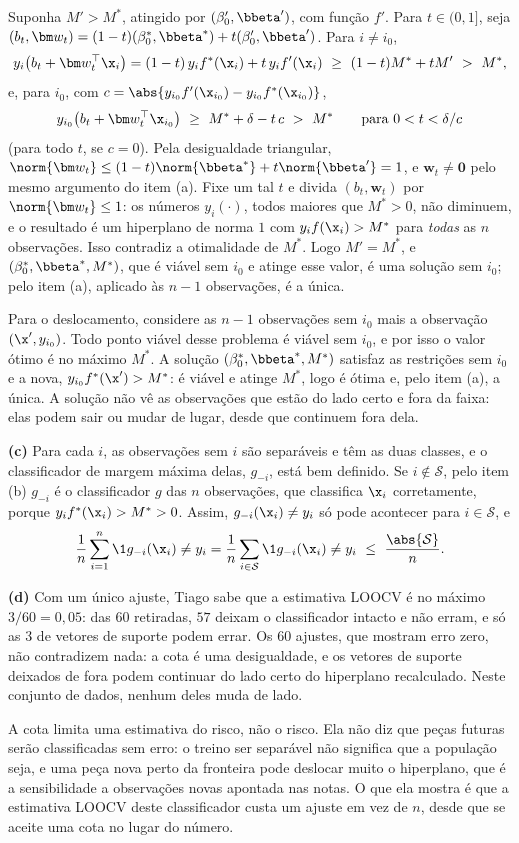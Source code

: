 \begin{solucao}
Suponha $M'>M^*$, atingido por $(\beta_0',\bbeta')$, com função $f'$. Para $t\in(0,1]$, seja
$(b_t,\bm w_t)=(1-t)(\beta_0^*,\bbeta^*)+t(\beta_0',\bbeta')$. Para $i\ne i_0$,
\[
  y_i\big(b_t+\bm w_t^\top\x_i\big)=(1-t)\,y_if^*(\x_i)+t\,y_if'(\x_i)\ \ge\ (1-t)M^*+tM'\ >\ M^* ,
\]
e, para $i_0$, com $c=\abs{y_{i_0}f'(\x_{i_0})-y_{i_0}f^*(\x_{i_0})}$,
\[
  y_{i_0}\big(b_t+\bm w_t^\top\x_{i_0}\big)\ \ge\ M^*+\delta-t\,c\ >\ M^*
  \qquad\text{para }0<t<\delta/c
\]
(para todo $t$, se $c=0$). Pela desigualdade triangular,
$\norm{\bm w_t}\le(1-t)\norm{\bbeta^*}+t\norm{\bbeta'}=1$, e $\bm w_t\ne\bm0$ pelo mesmo
argumento do item (a). Fixe um tal $t$ e divida $(b_t,\bm w_t)$ por $\norm{\bm w_t}\le1$: os
números $y_i(\cdot)$, todos maiores que $M^*>0$, não diminuem, e o resultado é um hiperplano
de norma $1$ com $y_if(\x_i)>M^*$ para \emph{todas} as $n$ observações. Isso contradiz a
otimalidade de $M^*$. Logo $M'=M^*$, e $(\beta_0^*,\bbeta^*,M^*)$, que é viável sem $i_0$ e
atinge esse valor, é uma solução sem $i_0$; pelo item (a), aplicado às $n-1$ observações, é a
única.

Para o deslocamento, considere as $n-1$ observações sem $i_0$ mais a observação
$(\x',y_{i_0})$. Todo ponto viável desse problema é viável sem $i_0$, e por isso o valor ótimo
é no máximo $M^*$. A solução $(\beta_0^*,\bbeta^*,M^*)$ satisfaz as restrições sem $i_0$ e a
nova, $y_{i_0}f^*(\x')>M^*$: é viável e atinge $M^*$, logo é ótima e, pelo item (a), a única. A
solução não vê as observações que estão do lado certo e fora da faixa: elas podem sair ou
mudar de lugar, desde que continuem fora dela.

\smallskip
\textbf{(c)} Para cada $i$, as observações sem $i$ são separáveis e têm as duas classes, e o
classificador de margem máxima delas, $g_{-i}$, está bem definido. Se $i\notin\mathcal S$,
pelo item (b) $g_{-i}$ é o classificador $g$ das $n$ observações, que classifica $\x_i$
corretamente, porque $y_if^*(\x_i)>M^*>0$. Assim, $g_{-i}(\x_i)\ne y_i$ só pode acontecer para
$i\in\mathcal S$, e
\[
  \frac1n\sum_{i=1}^n\1{g_{-i}(\x_i)\ne y_i}
  =\frac1n\sum_{i\in\mathcal S}\1{g_{-i}(\x_i)\ne y_i}\ \le\ \frac{\abs{\mathcal S}}{n} .
\]

\smallskip
\textbf{(d)} Com um único ajuste, Tiago sabe que a estimativa LOOCV é no máximo
$3/60=0{,}05$: das $60$ retiradas, $57$ deixam o classificador intacto e não erram, e só as
$3$ de vetores de suporte podem errar. Os $60$ ajustes, que mostram erro zero, não contradizem
nada: a cota é uma desigualdade, e os vetores de suporte deixados de fora podem continuar do
lado certo do hiperplano recalculado. Neste conjunto de dados, nenhum deles muda de lado.

A cota limita uma estimativa do risco, não o risco. Ela não diz que peças futuras serão
classificadas sem erro: o treino ser separável não significa que a população seja, e uma peça
nova perto da fronteira pode deslocar muito o hiperplano, que é a sensibilidade a observações
novas apontada nas notas. O que ela mostra é que a estimativa LOOCV deste classificador
custa um ajuste em vez de $n$, desde que se aceite uma cota no lugar do número.
\end{solucao}
